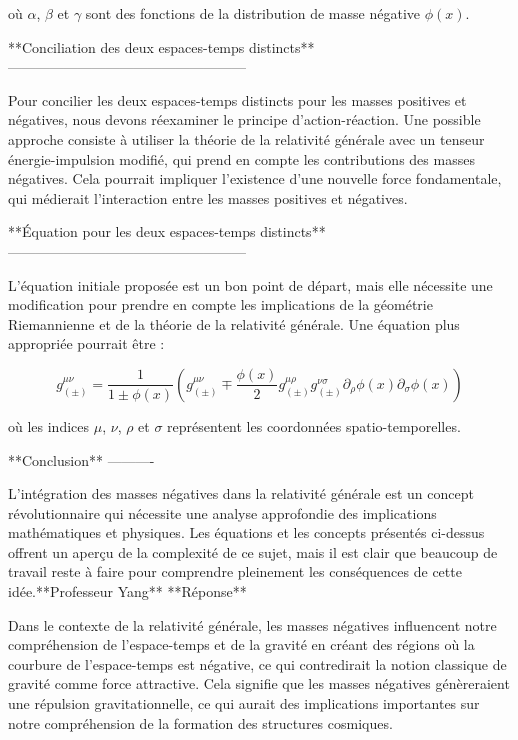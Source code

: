 où $\alpha$, $\beta$ et $\gamma$ sont des fonctions de la distribution de masse négative $\phi(x)$.

**Conciliation des deux espaces-temps distincts**
---------------------------------------------------

Pour concilier les deux espaces-temps distincts pour les masses positives et négatives, nous devons réexaminer le principe d'action-réaction. Une possible approche consiste à utiliser la théorie de la relativité générale avec un tenseur énergie-impulsion modifié, qui prend en compte les contributions des masses négatives. Cela pourrait impliquer l'existence d'une nouvelle force fondamentale, qui médierait l'interaction entre les masses positives et négatives.

**Équation pour les deux espaces-temps distincts**
---------------------------------------------------

L'équation initiale proposée est un bon point de départ, mais elle nécessite une modification pour prendre en compte les implications de la géométrie Riemannienne et de la théorie de la relativité générale. Une équation plus appropriée pourrait être :

$$g^{\mu \nu}_{(\pm)} = \frac{1}{1 \pm \phi(x)} \left(g^{\mu \nu}_{(\pm)} \mp \frac{\phi(x)}{2} g^{\mu \rho}_{(\pm)} g^{\nu \sigma}_{(\pm)} \partial_\rho \phi(x) \partial_\sigma \phi(x)\right)$$

où les indices $\mu$, $\nu$, $\rho$ et $\sigma$ représentent les coordonnées spatio-temporelles.

**Conclusion**
----------

L'intégration des masses négatives dans la relativité générale est un concept révolutionnaire qui nécessite une analyse approfondie des implications mathématiques et physiques. Les équations et les concepts présentés ci-dessus offrent un aperçu de la complexité de ce sujet, mais il est clair que beaucoup de travail reste à faire pour comprendre pleinement les conséquences de cette idée.**Professeur Yang**
**Réponse**

Dans le contexte de la relativité générale, les masses négatives influencent notre compréhension de l'espace-temps et de la gravité en créant des régions où la courbure de l'espace-temps est négative, ce qui contredirait la notion classique de gravité comme force attractive. Cela signifie que les masses négatives génèreraient une répulsion gravitationnelle, ce qui aurait des implications importantes sur notre compréhension de la formation des structures cosmiques.

